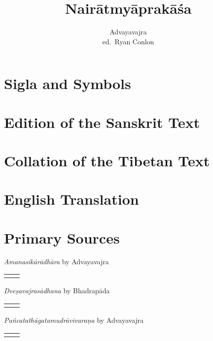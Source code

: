 \documentclass[12pt,twoside]{article}
\title{Nairātmyāprakāśa}
\author{Advayavajra \\ ed.\ Ryan Conlon}
\begin{document}
	\maketitle

\pagestyle{fancy}
\fancyhf{}
\fancyhead[LE,RO]{\thepage}

	\section{Sigla and Symbols}	
	

	\section{Edition of the Sanskrit Text}
	

	\section{Collation of the Tibetan Text}
	

	\section{English Translation}
	

	\newpage
	\theendnotes

	\EmbracOff

	\section*{Primary Sources}
\setlength{\LTpre}{0pt}
\setlength{\LTpost}{0pt}

\noindent\emph{Amanasikārādhāra} by Advayavajra
\noindent\begin{longtable}{ p{} p{} }
	& \cite[489–498]{mathes2015} 
\end{longtable}

\noindent\emph{Dveṣavajrasādhana} by Bhadrapāda
\noindent\begin{longtable}{ p{} p{} }
	& \cite[vol.\ 2 pp.\ 335–360]{gerloff2020} 
\end{longtable}

\noindent\emph{Pañcatathāgatamudrāvivaraṇa} by Advayavajra
\noindent\begin{longtable}{ p{} p{} }
	& \cite[371–384]{mathes2015} 
\end{longtable}
\end{document}
